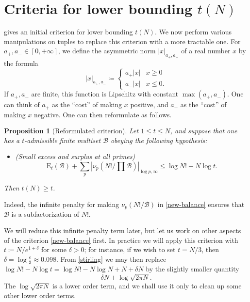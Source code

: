\documentclass[12pt,a4paper,reqno]{amsart}
\numberwithin{equation}{section}
\theoremstyle{plain}
\newtheorem{proposition}[theorem]{Proposition}
\theoremstyle{definition}
\newcommand\tuple{{\mathcal B}}
\newcommand\excess{{\mathrm{E}}}
\begin{document}
\section{Criteria for lower bounding \texorpdfstring{$t(N)$}{t(N)}}

 gives an initial criterion for lower bounding $t(N)$.  We now perform various manipulations on tuples to replace this criterion with a more tractable one.
For $a_+,a_- \in [0,+\infty]$, we define the asymmetric norm $|x|_{a_+,a_-}$ of a real number $x$ by the formula
$$ 
|x|_{a_+,a_-} \coloneqq  \begin{cases} 
  a_+ |x| & x\geq 0 \\
  a_- |x| & x\leq 0.
\end{cases}
$$
If $a_+,a_-$ are finite, this function is Lipschitz with constant $\max(a_+,a_-)$.  One can think of $a_+$ as the ``cost'' of making $x$ positive, and $a_-$ as the
``cost'' of making $x$ negative.  One can then reformulate  as follows.

\begin{proposition}[Reformulated criterion]\label{balance-reform}  Let $1 \leq t \leq N$, and suppose that one has a $t$-admissible finite multiset $\tuple$ obeying the following hypothesis:
  \begin{itemize}
  \item[(i)] (Small excess and surplus at all primes)
  \begin{equation}\label{new-balance}
    \excess_t(\tuple) + \sum_p |\nu_p(N!/\prod \tuple)|_{\log p,\infty} \leq \log N! - N \log t.
\end{equation}
\end{itemize}
Then $t(N) \geq t$.
\end{proposition}

Indeed, the infinite penalty for making $\nu_p(N!/\tuple)$ in \eqref{new-balance} ensures that $\tuple$ is a subfactorization of $N!$.

We will reduce this infinite penalty term later, but let us work on other aspects of the criterion \eqref{new-balance} first.  In practice we will apply this criterion with $t \coloneqq N / e^{1+\delta}$ for some $\delta>0$; for instance, if we wish to set $t = N/3$, then $\delta = \log \frac{e}{3} \approx 0.098$.  From \eqref{stirling} we may then replace $\log N! - N \log t = \log N! - N \log N + N + \delta N$ by the slightly smaller quantity
$$ \delta N + \log \sqrt{2\pi N}.$$
The $\log \sqrt{2\pi N}$ is a lower order term, and we shall use it only to clean up some other lower order terms.
\end{document}
